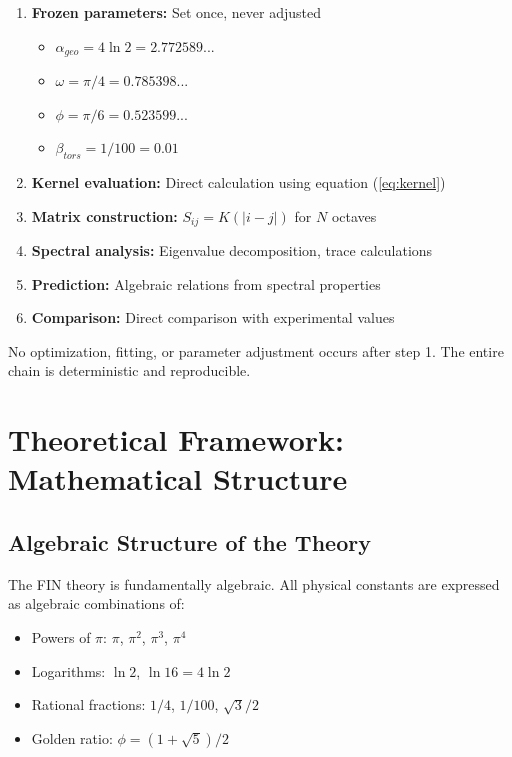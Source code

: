 \documentclass[11pt, a4paper]{article}
\begin{document}
\begin{enumerate}
    \item \textbf{Frozen parameters:} Set once, never adjusted
    \begin{itemize}
        \item $\alpha_{geo} = 4\ln 2 = 2.772589...$
        \item $\omega = \pi/4 = 0.785398...$
        \item $\phi = \pi/6 = 0.523599...$
        \item $\beta_{tors} = 1/100 = 0.01$
    \end{itemize}

    \item \textbf{Kernel evaluation:} Direct calculation using equation (\ref{eq:kernel})

    \item \textbf{Matrix construction:} $S_{ij} = K(|i-j|)$ for $N$ octaves

    \item \textbf{Spectral analysis:} Eigenvalue decomposition, trace calculations

    \item \textbf{Prediction:} Algebraic relations from spectral properties

    \item \textbf{Comparison:} Direct comparison with experimental values
\end{enumerate}

No optimization, fitting, or parameter adjustment occurs after step 1. The entire chain is deterministic and reproducible.

\section{Theoretical Framework: Mathematical Structure}

\subsection{Algebraic Structure of the Theory}

The FIN theory is fundamentally algebraic. All physical constants are expressed as algebraic combinations of:
\begin{itemize}
    \item Powers of $\pi$: $\pi$, $\pi^2$, $\pi^3$, $\pi^4$
    \item Logarithms: $\ln 2$, $\ln 16 = 4\ln 2$
    \item Rational fractions: $1/4$, $1/100$, $\sqrt{3}/2$
    \item Golden ratio: $\phi = (1+\sqrt{5})/2$
\end{itemize}
\end{document}
